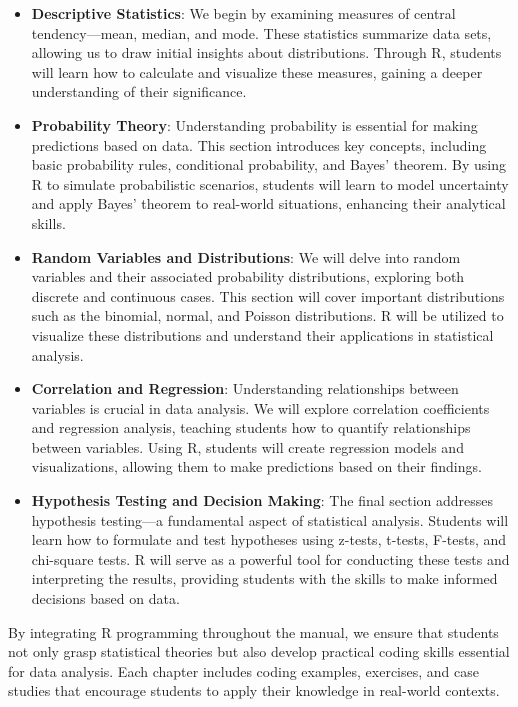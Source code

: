 \documentclass[12pt]{book}
\begin{document}
\begin{itemize}
    \item \textbf{Descriptive Statistics}: We begin by examining measures of central tendency—mean, median, and mode. These statistics summarize data sets, allowing us to draw initial insights about distributions. Through R, students will learn how to calculate and visualize these measures, gaining a deeper understanding of their significance.
    
    \item \textbf{Probability Theory}: Understanding probability is essential for making predictions based on data. This section introduces key concepts, including basic probability rules, conditional probability, and Bayes’ theorem. By using R to simulate probabilistic scenarios, students will learn to model uncertainty and apply Bayes’ theorem to real-world situations, enhancing their analytical skills.
    
    \item \textbf{Random Variables and Distributions}: We will delve into random variables and their associated probability distributions, exploring both discrete and continuous cases. This section will cover important distributions such as the binomial, normal, and Poisson distributions. R will be utilized to visualize these distributions and understand their applications in statistical analysis.
    
    \item \textbf{Correlation and Regression}: Understanding relationships between variables is crucial in data analysis. We will explore correlation coefficients and regression analysis, teaching students how to quantify relationships between variables. Using R, students will create regression models and visualizations, allowing them to make predictions based on their findings.
    
    \item \textbf{Hypothesis Testing and Decision Making}: The final section addresses hypothesis testing—a fundamental aspect of statistical analysis. Students will learn how to formulate and test hypotheses using z-tests, t-tests, F-tests, and chi-square tests. R will serve as a powerful tool for conducting these tests and interpreting the results, providing students with the skills to make informed decisions based on data.
\end{itemize}

By integrating R programming throughout the manual, we ensure that students not only grasp statistical theories but also develop practical coding skills essential for data analysis. Each chapter includes coding examples, exercises, and case studies that encourage students to apply their knowledge in real-world contexts.
\end{document}
